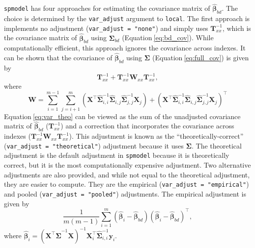 \documentclass[10pt,letterpaper]{article}
\begin{document}
\texttt{spmodel} has four approaches for estimating the covariance
matrix of \(\hat{\boldsymbol{\beta}}_{bd}\). The choice is determined by
the \texttt{var\_adjust} argument to \texttt{local}. The first approach
is implements no adjustment (\texttt{var\_adjust\ =\ "none"}) and simply
uses \(\mathbf{T}_{xx}^{-1}\), which is the covariance matrix of
\(\hat{\boldsymbol{\beta}}_{bd}\) using \(\boldsymbol{\Sigma}_{bd}\)
(Equation\(~\)\ref{eq:bd_cov}). While computationally efficient, this
approach ignores the covariance across indexes. It can be shown that the
covariance of \(\hat{\boldsymbol{\beta}}_{bd}\) using
\(\boldsymbol{\Sigma}\) (Equation\(~\)\ref{eq:full_cov}) is given by
\begin{equation}\label{eq:var_theo}
  \mathbf{T}_{xx}^{-1} + \mathbf{T}_{xx}^{-1} \mathbf{W}_{xx}\mathbf{T}_{xx}^{-1},
\end{equation} where \begin{equation*}
\mathbf{W} = \sum_{i = 1}^{m - 1} \sum_{j = i + 1}^m (\mathbf{X}^\top \hat{\boldsymbol{\Sigma}}^{-1}_{i, i} \hat{\boldsymbol{\Sigma}}_{i, j} \hat{\boldsymbol{\Sigma}}^{-1}_{j, j} \mathbf{X}_j) + (\mathbf{X}^\top \hat{\boldsymbol{\Sigma}}^{-1}_{i, i} \hat{\boldsymbol{\Sigma}}_{i, j} \hat{\boldsymbol{\Sigma}}^{-1}_{j, j} \mathbf{X}_j)^\top
\end{equation*} Equation\(~\)\ref{eq:var_theo} can be viewed as the sum
of the unadjusted covariance matrix of \(\hat{\boldsymbol{\beta}}_{bd}\)
(\(\mathbf{T}_{xx}^{-1}\)) and a correction that incorporates the
covariance across indexes
(\(\mathbf{T}_{xx}^{-1} \mathbf{W}_{xx}\mathbf{T}_{xx}^{-1}\)). This
adjustment is known as the ``theoretically-correct''
(\texttt{var\_adjust\ =\ "theoretical"}) adjustment because it uses
\(\boldsymbol{\Sigma}\). The theoretical adjustment is the default
adjustment in \texttt{spmodel} because it is theoretically correct, but
it is the most computationally expensive adjustment. Two alternative
adjustments are also provided, and while not equal to the theoretical
adjustment, they are easier to compute. They are the empirical
(\texttt{var\_adjust\ =\ "empirical"}) and pooled
(\texttt{var\_adjust\ =\ "pooled"}) adjustments. The empirical
adjustment is given by \begin{equation*}
\frac{1}{m(m -1)} \sum_{i = 1}^m (\boldsymbol{\hat{\beta}}_i - \boldsymbol{\hat{\beta}}_{bd})(\boldsymbol{\hat{\beta}}_i - \boldsymbol{\hat{\beta}}_{bd})^\top,
\end{equation*} where
\(\boldsymbol{\hat{\beta}}_i = (\mathbf{X}^\top \hat{\boldsymbol{\Sigma}}^{-1} \mathbf{X})^{-1}\mathbf{X}_i^\top \hat{\boldsymbol{\Sigma}}^{-1}_{i, i} \mathbf{y}_i\).
\end{document}
